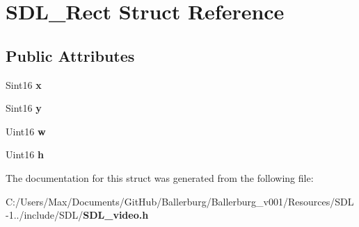 \section{S\+D\+L\+\_\+\+Rect Struct Reference}
\label{struct_s_d_l___rect}
\subsection*{Public Attributes}
\begin{DoxyCompactItemize}
\item 
Sint16 {\bfseries x}\label{struct_s_d_l___rect_a7a358b2006a14a40c0d52e5940d92c23}

\item 
Sint16 {\bfseries y}\label{struct_s_d_l___rect_a4d55e2006d059c2060f0a54ce4ce553d}

\item 
Uint16 {\bfseries w}\label{struct_s_d_l___rect_a1b56ba7422035ca0dc31f052638a7042}

\item 
Uint16 {\bfseries h}\label{struct_s_d_l___rect_a89f7a624cd7d5c901f2c7746d1af26c6}

\end{DoxyCompactItemize}


The documentation for this struct was generated from the following file\+:\begin{DoxyCompactItemize}
\item 
C\+:/\+Users/\+Max/\+Documents/\+Git\+Hub/\+Ballerburg/\+Ballerburg\+\_\+v001/\+Resources/\+S\+D\+L-\/1../include/\+S\+D\+L/{\bf S\+D\+L\+\_\+video.\+h}\end{DoxyCompactItemize}
